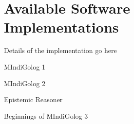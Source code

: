 \chapter{Available Software Implementations}\label{ch:implementation}

Details of the implementation go here

MIndiGolog 1

MIndiGolog 2

Epistemic Reasoner

Beginnings of MIndiGolog 3


